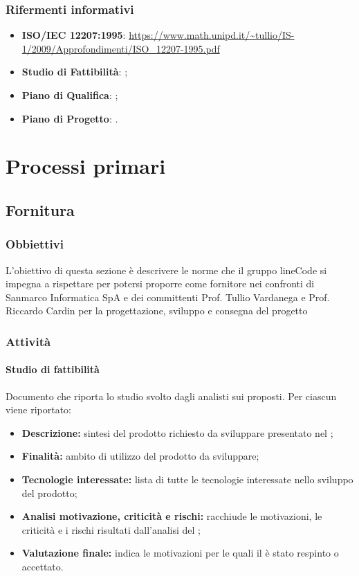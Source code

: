 \documentclass[]{article}
\begin{document}
			\subsubsection{Rifermenti informativi}
			\begin{itemize}
				\item \textbf{ISO/IEC 12207:1995}: \url{https://www.math.unipd.it/~tullio/IS-1/2009/Approfondimenti/ISO_12207-1995.pdf}
				\item \textbf{Studio di Fattibilità}: ; %
				\item \textbf{Piano di Qualifica}: ;
				\item \textbf{Piano di Progetto}: .
			\end{itemize}


			\newpage

			\section{Processi primari}

				\subsection{Fornitura}

					\subsubsection{Obbiettivi}
					L'obiettivo di questa sezione è descrivere le norme che il gruppo lineCode si impegna a rispettare per potersi proporre come fornitore nei confronti di Sanmarco Informatica SpA e dei committenti Prof. Tullio Vardanega e Prof. Riccardo Cardin per la progettazione, sviluppo e consegna del progetto 

					\subsubsection{Attività}
						\paragraph{Studio di fattibilità}
					    	Documento che riporta lo studio svolto dagli analisti sui  proposti. Per ciascun  viene riportato:
						 \begin{itemize}
						 	\item \textbf{Descrizione:} sintesi del prodotto richiesto da sviluppare presentato nel ;
						 	\item \textbf{Finalità:} ambito di utilizzo del prodotto da sviluppare;
						 	\item \textbf{Tecnologie interessate:} lista di tutte le tecnologie interessate nello sviluppo del prodotto;
						 	\item \textbf{Analisi motivazione, criticità e rischi:} racchiude le motivazioni, le criticità e i rischi risultati dall'analisi del ;
						 	\item \textbf{Valutazione finale:} indica le motivazioni per le quali il  è stato respinto o accettato.
						 \end{itemize}
\end{document}
